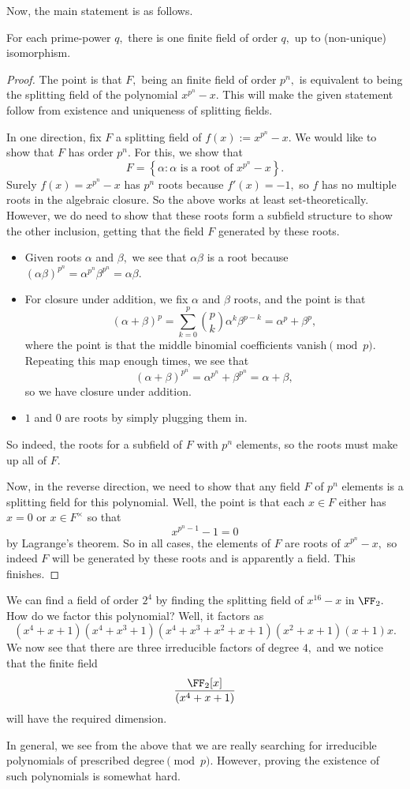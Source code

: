 Now, the main statement is as follows.
\begin{theorem}
	For each prime-power $q,$ there is one finite field of order $q,$ up to (non-unique) isomorphism.
\end{theorem}
\begin{proof}
	The point is that $F,$ being an finite field of order $p^n,$ is equivalent to being the splitting field of the polynomial $x^{p^n}-x.$ This will make the given statement follow from existence and uniqueness of splitting fields.

	In one direction, fix $F$ a splitting field of $f(x):=x^{p^n}-x.$ We would like to show that $F$ has order $p^n.$ For this, we show that
	\[F=\left\{\alpha:\alpha\text{ is a root of }x^{p^n}-x\right\}.\]
	Surely $f(x)=x^{p^n}-x$ has $p^n$ roots because $f'(x)=-1,$ so $f$ has no multiple roots in the algebraic closure. So the above works at least set-theoretically. However, we do need to show that these roots form a subfield structure to show the other inclusion, getting that the field $F$ generated by these roots.
	\begin{itemize}
		\item Given roots $\alpha$ and $\beta,$ we see that $\alpha\beta$ is a root because $(\alpha\beta)^{p^n}=\alpha^{p^n}\beta^{p^n}=\alpha\beta.$
		\item For closure under addition, we fix $\alpha$ and $\beta$ roots, and the point is that
		\[(\alpha+\beta)^p=\sum_{k=0}^p\binom pk\alpha^k\beta^{p-k}=\alpha^p+\beta^p,\]
		where the point is that the middle binomial coefficients vanish$\pmod p.$ Repeating this map enough times, we see that
		\[(\alpha+\beta)^{p^n}=\alpha^{p^n}+\beta^{p^n}=\alpha+\beta,\]
		so we have closure under addition.
		\item $1$ and $0$ are roots by simply plugging them in.
	\end{itemize}
	So indeed, the roots for a subfield of $F$ with $p^n$ elements, so the roots must make up all of $F.$

	Now, in the reverse direction, we need to show that any field $F$ of $p^n$ elements is a splitting field for this polynomial. Well, the point is that each $x\in F$ either has $x=0$ or $x\in F^\times$ so that
	\[x^{p^n-1}-1=0\]
	by Lagrange's theorem. So in all cases, the elements of $F$ are roots of $x^{p^n}-x,$ so indeed $F$ will be generated by these roots and is apparently a field. This finishes.
\end{proof}
\begin{ex}
	We can find a field of order $2^4$ by finding the splitting field of $x^{16}-x$ in $\FF_2.$ How do we factor this polynomial? Well, it factors as
	\[\left(x^4+x+1\right)\left(x^4+x^3+1\right)\left(x^4+x^3+x^2+x+1\right)\left(x^2+x+1\right)\left(x+1\right)x.\]
	We now see that there are three irreducible factors of degree $4,$ and we notice that the finite field
	\[\frac{\FF_2[x]}{\left(x^4+x+1\right)}\]
	will have the required dimension.
\end{ex}
In general, we see from the above that we are really searching for irreducible polynomials of prescribed degree$\pmod p.$ However, proving the existence of such polynomials is somewhat hard.

